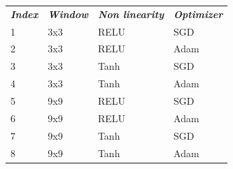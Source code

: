 \documentclass{article}
\begin{document}
\begin{table}[h!]
\begin{tabular}{llll}
\textit{\textbf{Index}} & \textit{\textbf{Window}} & \textit{\textbf{Non linearity}} & \textit{\textbf{Optimizer}} \\
1                       & 3x3                      & RELU                            & SGD                         \\
2                       & 3x3                      & RELU                            & Adam                        \\
3                       & 3x3                      & Tanh                            & SGD                         \\
4                       & 3x3                      & Tanh                            & Adam                        \\
5                       & 9x9                      & RELU                            & SGD                         \\
6                       & 9x9                      & RELU                            & Adam                        \\
7                       & 9x9                      & Tanh                            & SGD                         \\
8                       & 9x9                      & Tanh                            & Adam                       
\end{tabular}
\end{table}
\end{document}
